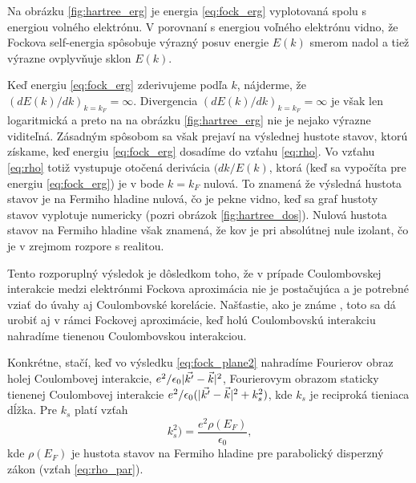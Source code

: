 Na obrázku \ref{fig:hartree_erg} je energia \eqref{eq:fock_erg} vyplotovaná spolu s energiou volného elektrónu.
V porovnaní s energiou voľného elektrónu vidno, že Fockova self-energia spôsobuje výrazný posuv energie $E(k)$ smerom nadol a tiež výrazne ovplyvňuje sklon $E(k)$.




Keď energiu \eqref{eq:fock_erg} zderivujeme podľa $k$, nájderme, že $(dE(k)/dk)_{k=k_F}=\infty$. Divergencia
$(dE(k)/dk)_{k=k_F}=\infty$ je však len logaritmická a preto na na obrázku \ref{fig:hartree_erg} nie je nejako výrazne viditeľná. Zásadným spôsobom sa však prejaví 
 na výslednej hustote stavov, ktorú získame, keď energiu \eqref{eq:fock_erg} dosadíme
do vzťahu \eqref{eq:rho}. Vo vzťahu \eqref{eq:rho} totiž vystupuje otočená derivácia $(dk/E(k)$, ktorá (keď sa vypočíta pre energiu \eqref{eq:fock_erg}) je v bode $k=k_F$ nulová.
To znamená že výsledná hustota stavov je na Fermiho hladine nulová, čo je pekne vidno, keď sa graf hustoty stavov vyplotuje numericky (pozri obrázok \ref{fig:hartree_dos}).
Nulová hustota stavov na Fermiho hladine však znamená, že kov je pri absolútnej nule izolant, čo je v zrejmom rozpore s realitou.

Tento rozporuplný výsledok je dôsledkom toho, že v prípade Coulombovskej interakcie medzi elektrónmi Fockova aproximácia nie je postačujúca a je potrebné
vziať do úvahy aj Coulombovské korelácie. Našťastie, ako je známe \cite{Mermin}, toto sa dá urobiť aj v rámci Fockovej aproximácie, keď holú Coulombovskú interakciu nahradíme
tienenou Coulombovskou interakciou.  









Konkrétne, stačí, keď vo výsledku \eqref{eq:fock_plane2} nahradíme Fourierov obraz holej Coulombovej interakcie, $e^2/\epsilon_0|\vec{k'}-\vec{k}|^2$, 
Fourierovym obrazom staticky tienenej Coulombovej interakcie $e^2/\epsilon_0(|\vec{k'}-\vec{k}|^2+k_s^2)$, kde $k_s$ je reciproká tieniaca dĺžka. Pre  $k_s$ platí vzťah
\begin{equation}
  \label{eq:screeningvector}
  k_s^2) = \frac{e^2 \rho(E_F)}{\epsilon_0} \text{,}
 \end{equation}
kde $\rho(E_F)$ je hustota stavov na Fermiho hladine pre parabolický disperzný zákon (vzťah \eqref{eq:rho_par}). 

